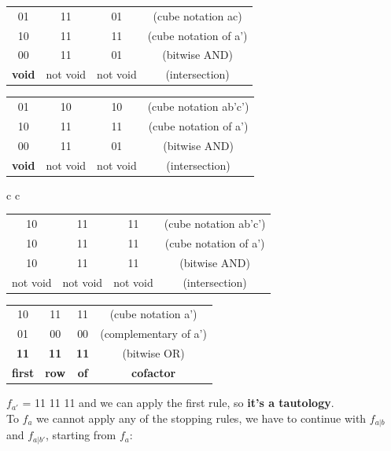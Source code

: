 \begin{center}
	\begin{tabular}{c c c c}
		01 & 11 & 01 & (cube notation ac) \\ 
		10 & 11 & 11 & (cube notation of a')\\ \hline 
		00 & 11 & 01 & (bitwise AND) \\ \hline
		\textbf{void} & not void & not void & (intersection)
	\end{tabular}
\end{center}

\begin{center}
	\begin{tabular}{c c c c}
		01 & 10 & 10 & (cube notation ab'c') \\ 
		10 & 11 & 11 & (cube notation of a')\\ \hline 
		00 & 11 & 01 & (bitwise AND) \\ \hline
		\textbf{void} & not void & not void & (intersection)
	\end{tabular}
\end{center}

\begin{center}
	\begin{tabular}{c c}
		\begin{tabular}{c c c c}
			10 & 11 & 11 & (cube notation ab'c') \\ 
			10 & 11 & 11 & (cube notation of a')\\ \hline 
			10 & 11 & 11 & (bitwise AND) \\ \hline
			not void & not void & not void & (intersection)
		\end{tabular}
		\quad\quad
		\begin{tabular}{c  c  c c}
			10 & 11 & 11 & (cube notation a') \\ 
			01 & 00 & 00 & (complementary of a')\\ \hline 
			\textbf{11} & \textbf{11} & \textbf{11} & (bitwise OR) \\ \hline
			\textbf{first} & \textbf{row} & \textbf{of} & \textbf{cofactor} \\
		\end{tabular}
		
	\end{tabular}
\end{center}
 $f_{a'}$ = 11 11 11 and we can apply the first rule, so \textbf{it's a tautology}. \\
 
To $f_{a}$ we cannot apply any of the stopping rules, we have to continue with $f_{a|b}$ and $f_{a|b'}$, starting from $f_{a}$:

